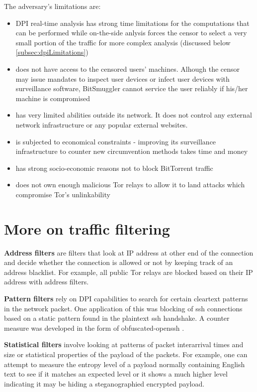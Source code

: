 \documentclass[11pt]{book} %
\newcommand{\projectName}{BitSmuggler }
\begin{document}
The adversary's limitations are:

\begin{itemize}
\item DPI real-time analysis has strong time limitations for the computations that can be performed while on-the-side anlysis forces the censor to select a very small portion of the traffic for more complex analysis (discussed below  \ref{subsec:dpiLimitations}) 
\item does not have access to the censored users' machines. Alhough the censor may issue mandates to inspect user devices or infect user devices with surveillance software, \projectName cannot service the user reliably if his/her machine is compromised
\item has very limited abilities outside its network. It does not control any external network infrastructure or any popular external websites.
\item is subjected to economical constraints - improving its surveillance infrastructure to counter new circumvention methods takes time and money
\item has strong socio-economic reasons not to block BitTorrent traffic
\item does not own enough malicious Tor relays to allow it to land attacks which compromise Tor's unlinkability
\end{itemize}

\section{More on traffic filtering}
\label{subsec:trafficFiltering}

\textbf{Address filters} are filters that look at IP address at other end of the connection and decide whether the connection is allowed or not by keeping track of an address blacklist. For example, all public Tor relays are blocked based on their IP address with address filters.

\textbf{Pattern filters} rely on DPI capabilities to search for certain cleartext patterns in the network packet. One application of this was blocking of ssh connections based on a static pattern found in the plaintext ssh handshake. A counter measure was developed in the form of obfuscated-openssh \citep*{web:obfuscatedSSHRepo}.

\textbf{Statistical filters} involve looking at patterns of packet interarrival times and size or statistical properties of the payload of the packets. For example, one can attempt to measure the entropy level of a payload normally containing English text to see if it matches an expected level or it shows a much higher level indicating it may be hiding a steganographied encrypted payload.
\end{document}
